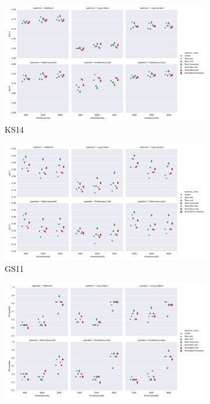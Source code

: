 \begin{figure}[b]
  \centering

  \begin{subfigure}[t]{0.9\textwidth}
  \includegraphics[width=\textwidth]{supplement/figures/frobenius-KS14-plot}

  \caption{KS14}
  \label{fig:frobenius-ks14-plot}
  \end{subfigure}

  \begin{subfigure}[t]{0.9\textwidth}
  \includegraphics[width=\textwidth]{supplement/figures/frobenius-GS11-plot}

  \caption{GS11}
  \label{fig:frobenius-gs11-plot}
  \end{subfigure}

  \begin{subfigure}[t]{0.9\textwidth}
  \includegraphics[width=\textwidth]{supplement/figures/frobenius-PhraseRel-plot}


\end{subfigure}
\end{figure}
